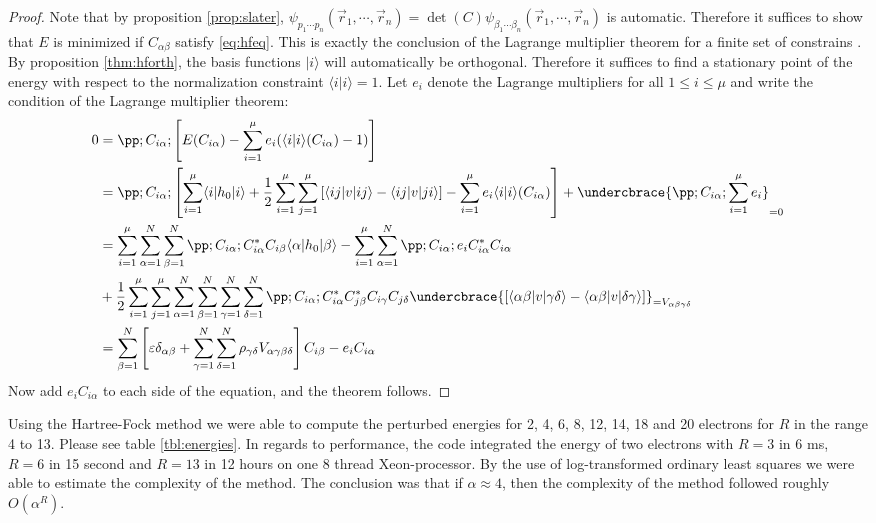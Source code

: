 \documentclass[11pt,english,a4paper]{article}
\begin{document}
\begin{proof}
Note that by proposition \ref{prop:slater}, $\psi_{  p_1\cdots p_n}(\vec{r}_1,\cdots, \vec{r}_n) = \det (C) \psi_{  \beta_1\cdots \beta_n}(\vec{r}_1,\cdots, \vec{r}_n)$ is automatic. Therefore it suffices to show that $E$ is minimized if $C_{  \alpha \beta}$ satisfy \eqref{eq:hfeq}. This is exactly the conclusion of the Lagrange multiplier theorem for a finite set of constrains \parencite[405]{lindstrom_flervariabel_2011}. By proposition \ref{thm:hforth}, the basis functions $ |  i \rangle$ will automatically be orthogonal. Therefore it suffices to find a stationary point of the energy with respect to the normalization constraint $\langle i|i \rangle = 1$. Let $e_i$ denote the Lagrange multipliers for all $1 \leq i \leq \mu$ and write the condition of the Lagrange multiplier theorem:
\begin{align*}
0 &= \pp ;C_{  i \alpha}; \left[ E(C_{  i \alpha}) - \sum_{i=1}^\mu e_i(\langle i|i \rangle(C_{  i \alpha}) - 1) \right] \\
&= \pp ;C_{  i \alpha}; \left[ 
\sum_{i=1}^\mu \langle i | h_0 | i \rangle + \frac{1}{2} \sum_{i=1}^\mu \sum_{j=1}^\mu \left[ \langle ij|v|ij \rangle - \langle ij|v|ji \rangle \right]
- \sum_{i=1}^\mu e_i\langle i|i \rangle(C_{  i \alpha} )
\right] + \undercbrace{\pp ;C_{  i \alpha}; \sum_{i=1}^\mu e_i}_{  =0}\\
&=  
\sum_{i=1}^\mu \sum_{\alpha=1}^N \sum_{\beta=1}^N\pp ;C_{  i \alpha}; C^*_{  i\alpha} C_{  i \beta} \langle \alpha | h_0 | \beta \rangle - \sum_{i=1}^\mu\sum_{\alpha=1}^N \pp ;C_{  i \alpha};e_iC^*_{  i\alpha} C_{  i \alpha}\\
&+ \frac{1}{2} \sum_{i=1}^\mu \sum_{j=1}^\mu \sum_{\alpha=1}^N\sum_{\beta=1}^N\sum_{\gamma=1}^N\sum_{\delta=1}^N\pp ;C_{  i \alpha}; C^*_{  i\alpha} C_{  j \beta}^*C_{  i\gamma} C_{  j \delta} \undercbrace{\left[ \langle \alpha \beta|v|\gamma \delta \rangle - \langle \alpha \beta|v|\delta \gamma \rangle \right]}_{=V_{  \alpha \beta \gamma \delta}} \\
&= \sum_{\beta=1}^N \left[ \varepsilon \delta_{  \alpha \beta} + \sum_{\gamma = 1}^N \sum_{\delta=1}^N \rho_{  \gamma \delta} V_{  \alpha \gamma \beta \delta} \right] C_{  i \beta} - e_i C_{  i \alpha}
\end{align*}
Now add $e_i C_{  i \alpha}$ to each side of the equation, and the theorem follows.
\end{proof}
Using the Hartree-Fock method we were able to compute the perturbed energies for 2, 4, 6, 8, 12, 14, 18 and 20 electrons for $R$ in the range 4 to 13. Please see table \ref{tbl:energies}. In regards to performance, the code integrated the energy of two electrons with $R=3$ in 6 ms, $R=6$ in 15 second and $R=13$ in 12 hours on one 8 thread Xeon-processor. By the use of log-transformed ordinary least squares we were able to estimate the complexity of the method. The conclusion was that if $\alpha \approx 4$, then the complexity of the method followed roughly $O(\alpha^R)$.\\
\end{document}
